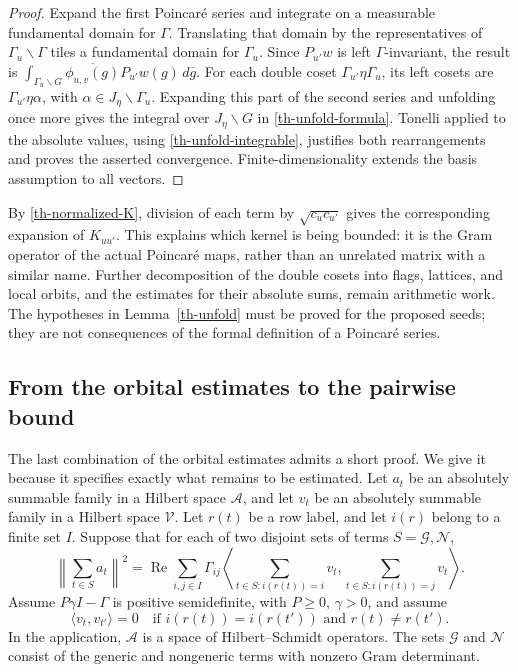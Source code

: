 \begin{proof}
Expand the first Poincar\'e series and integrate on a measurable
fundamental domain for $\Gamma$.  Translating that domain by the
representatives of $\Gamma_u\backslash\Gamma$ tiles a fundamental
domain for $\Gamma_u$.  Since $P_{u'}w$ is left $\Gamma$-invariant,
the result is
$\int_{\Gamma_u\backslash G}
\overline{\phi_{u,v}(g)}P_{u'}w(g)\,d\bar g$.
For each double coset $\Gamma_{u'}\eta\Gamma_u$, its left cosets
are $\Gamma_{u'}\eta\alpha$, with
$\alpha\in J_\eta\backslash\Gamma_u$.
Expanding this part of the second series and unfolding once more
gives the integral over $J_\eta\backslash G$ in
\eqref{th-unfold-formula}.  Tonelli applied to the absolute values,
using \eqref{th-unfold-integrable}, justifies both rearrangements
and proves the asserted convergence.  Finite-dimensionality extends
the basis assumption to all vectors.
\end{proof}

By \eqref{th-normalized-K}, division of each term by $\sqrt{c_uc_{u'}}$
gives the corresponding expansion of $K_{uu'}$.  This explains which
kernel is being bounded: it is the Gram operator of the actual
Poincar\'e maps, rather than an unrelated matrix with a similar name.
Further decomposition of the double cosets into flags, lattices,
and local orbits, and the estimates for their absolute sums, remain
arithmetic work.  The hypotheses in Lemma~\ref{th-unfold} must be
proved for the proposed seeds; they are not consequences of the
formal definition of a Poincar\'e series.

\subsection{From the orbital estimates to the pairwise bound}

The last combination of the orbital estimates admits a short proof.
We give it because it specifies exactly what remains to be estimated.
Let $a_t$ be an absolutely summable family in a Hilbert space
$\mathcal A$, and let $v_t$ be an absolutely summable family in a
Hilbert space $\mathcal V$.  Let $r(t)$ be a row label, and let
$i(r)$ belong to a finite set $I$.  Suppose that for each of two
disjoint sets of terms $S=\mathcal G,\mathcal N$,
\begin{equation}\label{th-row-norm}
 \left\|\sum_{t\in S}a_t\right\|^2
  =\operatorname{Re}\sum_{i,j\in I}\Gamma_{ij}
       \left\langle\sum_{t\in S:i(r(t))=i}v_t,
                       \sum_{t\in S:i(r(t))=j}v_t\right\rangle.
\end{equation}
Assume $P\gamma I-\Gamma$ is positive semidefinite, with
$P\ge0$, $\gamma>0$, and assume
\begin{equation}\label{th-row-orth}
 \langle v_t,v_{t'}\rangle=0
 \quad\text{if }i(r(t))=i(r(t'))\text{ and }r(t)\ne r(t').
\end{equation}
In the application, $\mathcal A$ is a space of Hilbert--Schmidt
operators.  The sets $\mathcal G$ and $\mathcal N$ consist of the
generic and nongeneric terms with nonzero Gram determinant.

